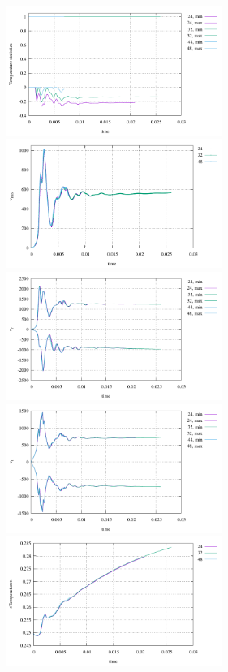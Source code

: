 \begin{center}
\includegraphics[width=7cm]{python_codes/fieldstone_106/results/exp1/stats_T.pdf}
\includegraphics[width=7cm]{python_codes/fieldstone_106/results/exp1/vrms.pdf}\\
\includegraphics[width=7cm]{python_codes/fieldstone_106/results/exp1/stats_vr.pdf}
\includegraphics[width=7cm]{python_codes/fieldstone_106/results/exp1/stats_vt.pdf}\\
\includegraphics[width=7cm]{python_codes/fieldstone_106/results/exp1/Tavrg.pdf}

\end{center}

